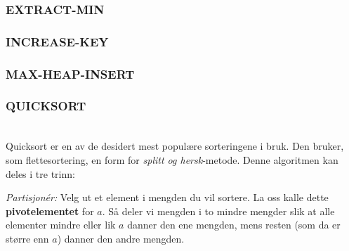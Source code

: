 \subsubsection{EXTRACT-MIN}

\subsubsection{INCREASE-KEY}

\subsubsection{MAX-HEAP-INSERT}

\subsubsection{QUICKSORT}\\
Quicksort er en av de desidert mest populære sorteringene i bruk. Den bruker, som flettesortering, en form for \textit{splitt og hersk}-metode. Denne algoritmen kan deles i tre trinn:\newline

\noindent\textit{Partisjonér:} Velg ut et element i mengden du vil sortere. La oss kalle dette \textbf{pivotelementet} for $a$. Så deler vi mengden i to mindre mengder slik at alle elementer mindre eller lik $a$ danner den ene mengden, mens resten (som da er større enn $a$) danner den andre mengden.

